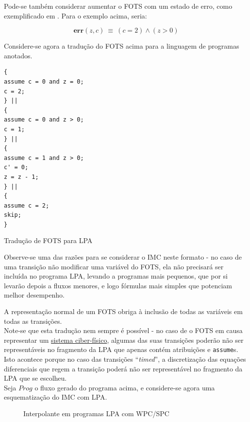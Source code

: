 \documentclass[11pt,a4paper]{report}%
\newenvironment{code}{\captionsetup{type=listing}}{}
\begin{document}
Pode-se também considerar aumentar o FOTS com um estado de erro, como exemplificado
em \cite{interpolation_state_of_art}. Para o exemplo acima, seria:

$$
\textbf{err}(z, c) \ \equiv \ (c = 2) \land (z > 0)
$$

Considere-se agora a tradução do FOTS acima para a linguagem de programas anotados.

\begin{code}
\begin{verbatim}
{
assume c = 0 and z = 0;
c = 2;
} ||
{
assume c = 0 and z > 0;
c = 1;
} ||
{
assume c = 1 and z > 0;
c' = 0;
z = z - 1;
} ||
{
assume c = 2;
skip;
}
\end{verbatim}
\caption{Tradução de FOTS para LPA}
\label{code:fots_to_lpa}
\end{code}

Observe-se uma das razões para se considerar o IMC neste formato - no caso de uma
transição não modificar uma variável do FOTS, ela não precisará ser incluída no
programa LPA, levando a programas mais pequenos, que por si levarão depois a fluxos
menores, e logo fórmulas mais simples que potenciam melhor desempenho.

A representação normal de um FOTS obriga à inclusão de todas as variáveis em todas as
transições.\\

Note-se que esta tradução nem sempre é possível - no caso de o FOTS em causa representar
um \href{https://paper.dropbox.com/doc/Capitulo-4-Sistemas-Hibridos-ycW40nf36f1eZW4f4k5e8}{sistema ciber-físico},
algumas das suas transições poderão não ser representáveis no fragmento da LPA que apenas
contém atribuições e \texttt{assume}s.
Isto acontece porque no caso das transições ``\textit{timed}'', a discretização das
equações diferenciais que regem a transição poderá não ser representável no fragmento
da LPA que se escolheu.\\

Seja $Prog$ o fluxo gerado do programa acima, e considere-se agora uma esquematização do IMC com LPA.

\begin{figure}[H]
\centering
{}
\caption{Interpolante em programas LPA com WPC/SPC}
\label{fig:lpa_wpc_spc}
\end{figure}
\end{document}
